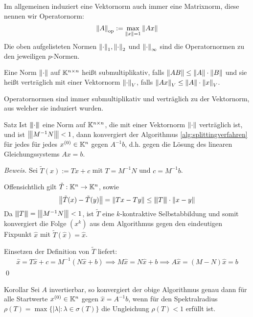 Im allgemeinen induziert eine Vektornorm auch immer eine Matrixnorm, diese nennen wir Operatornorm:
%
\begin{align*}
  \vertn{2}{A}_{\op}:=\max_{\vertn{2}{x}=1}\vertn{2}{Ax}
\end{align*}
%
Die oben aufgelisteten Normen $\vertn{2}{\cdot}_1,\vertn{2}{\cdot}_2$ und $\vertn{2}{\cdot}_\infty$ sind die 
Operatornormen zu den jeweiligen $p$-Normen.

Eine Norm $\vertn{2}{\cdot}$ auf $\mathbb K^{n\times n}$ heißt submultiplikativ, falls 
$\vertn{2}{AB}\leq\vertn{2}{A}\cdot\vertn{2}{B}$ 
und sie heißt verträglich mit einer Vektornorm $\vertn{2}{\cdot}_V$, falls 
$\vertn{2}{Ax}_V\leq \vertn{2}{A}\cdot\vertn{2}{x}_V$. 

Operatornormen sind immer submultiplikativ und verträglich zu der Vektornorm, aus welcher sie induziert wurden.

\begin{colbox}{Satz}\label{satz:konvergenzAlg1Norm}
  Ist $\vertn{3}{\cdot}$ eine Norm auf $\mathbb K^{n\times n}$, die mit einer Vektornorm $\vertn{2}{\cdot}$ verträglich ist, 
  und ist $\vertn{3}{M^{-1}N}<1$, dann konvergiert der Algorithmus \ref{alg:splittingverfahren} 
  für jedes für jedes $x^{(0)}\in\mathbb K^n$ gegen $A^{-1}b$, d.h. gegen die Lösung des linearen Gleichungssystems $Ax=b$.
\end{colbox}

\textit{Beweis.} 
Sei $\tilde{T}(x) := Tx + c$ mit $T=M^{-1}N$ und $c=M^{-1}b$.

Offensichtlich gilt $\tilde{T}:\mathbb K^n\rightarrow\mathbb K^n$, sowie 
%
\begin{align*}
  \vertn{2}{\tilde{T}(x)-\tilde{T}(y)} 
  = \vertn{2}{Tx-Ty}
  \leq \vertn{3}{T}\cdot\vertn{2}{x-y}
\end{align*}
%
Da $\vertn{3}{T}=\vertn{3}{M^{-1}N}<1$, ist $\tilde{T}$ eine $k$-kontraktive Selbstabbildung und somit konvergiert 
die Folge $(x^k)$ aus dem Algorithmus gegen den eindeutigen Fixpunkt $\hat{x}$ mit $\tilde{T}(\hat{x})=\hat{x}$. 

Einsetzen der Definition von $\tilde{T}$ liefert:
%
\begin{align*}
  \hat{x}=T\hat{x}+c=M^{-1}(N\hat{x}+b)
  \implies M\hat{x}=N\hat{x}+b 
  \implies A\hat{x}=(M-N)\hat{x}=b
\end{align*}
%
\qed

\begin{colbox}{Korollar}\label{cor:konvergenzAlg1Spektralradius}
  Sei $A$ invertierbar, so konvergiert der obige Algorithmus genau dann für alle Startwerte $x^{(0)}\in\mathbb K^n$ 
  gegen $\hat{x}=A^{-1}b$, wenn für den Spektralradius $\rho(T)=\max\{|\lambda|:\lambda\in\sigma(T)\}$ 
  die Ungleichung $\rho(T)<1$ erfüllt ist.
\end{colbox}

